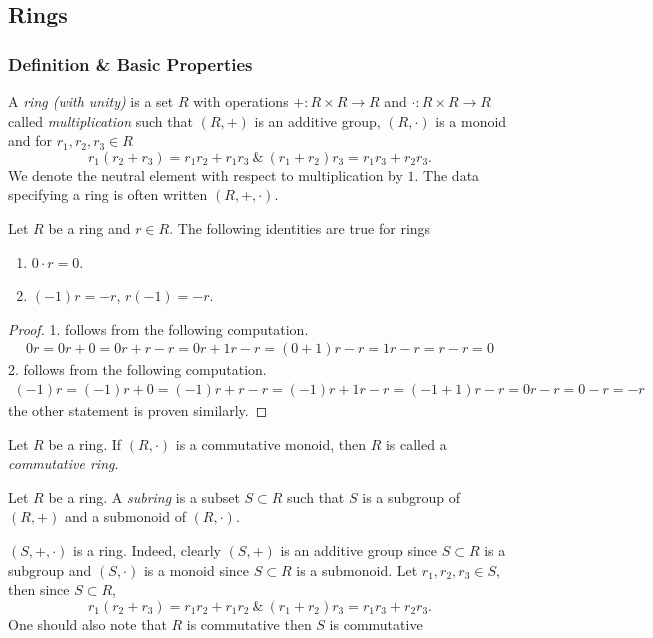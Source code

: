 \subsection{Rings}
\subsubsection{Definition \& Basic Properties}
\begin{definition}
    A \textit{ring (with unity)} is a set $R$ with operations $+: R\times R \rightarrow R$ and $\cdot: R\times R \rightarrow R$ called \textit{multiplication} such that $(R,+)$ is an additive group, $(R,\cdot)$ is a monoid and for $r_1,r_2,r_3\in R$
    $$r_1(r_2+r_3) = r_1r_2+r_1r_3 \ \& \ (r_1+r_2)r_3 = r_1r_3+r_2r_3.$$
    We denote the neutral element with respect to multiplication by $1$. The data specifying a ring is often written $(R,+,\cdot)$. 
\end{definition}
\begin{lemma}\label{ImportantRingIdentities}
    Let $R$ be a ring and $r\in R$. The following identities are true for rings
    \begin{enumerate}
        \item $0\cdot r = 0$.
        \item $(-1)r = -r $, $r(-1) = -r$.
    \end{enumerate}
\end{lemma}
\begin{proof}
    1. follows from the following computation.
    \begin{align*}
        0r = 0r + 0 = 0r+r-r = 0r+1r-r=(0+1)r-r = 1r-r=r-r=0
    \end{align*}
    2. follows from the following computation.
    \begin{align*}
       (-1)r = (-1)r+0 = (-1)r+r-r = (-1)r+1r-r=(-1+1)r-r = 0r-r=0-r=-r
    \end{align*}
    the other statement is proven similarly.  
\end{proof}
\begin{definition}
    Let $R$ be a ring. If $(R,\cdot)$ is a commutative monoid, then $R$ is called a \textit{commutative ring}.  
\end{definition}
\begin{definition}
    Let $R$ be a ring. A \textit{subring} is a subset $S\subset R$ such that $S$ is a subgroup of $(R,+)$ and a submonoid of $(R,\cdot)$. 
\end{definition}
\begin{remark}\label{CommutativeRingRemark}
    $(S,+,\cdot)$ is a ring. Indeed, clearly $(S,+)$ is an additive group since $S\subset R$ is a subgroup and $(S,\cdot)$ is a monoid since $S\subset R$ is a submonoid. Let $r_1,r_2,r_3\in S$, then since $S\subset R$,
    $$r_1(r_2+r_3)= r_1r_2+r_1r_2 \ \& \ (r_1+r_2)r_3=r_1r_3+r_2r_3.$$
    One should also note that $R$ is commutative then $S$ is commutative
\end{remark}
